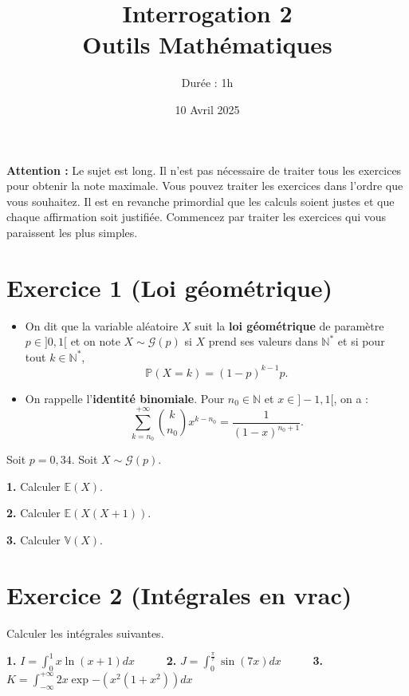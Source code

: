 \documentclass{article}
\title{Interrogation 2 \\
Outils Mathématiques}
\author{Durée : 1h}
\date{10 Avril 2025}
\newcommand{\E}{\mathbb{E}}
\newcommand{\prob}{\mathbb{P}}
\begin{document}
\maketitle

\textbf{Attention :} Le sujet est long. Il n'est pas nécessaire de traiter tous les exercices pour obtenir la note maximale. Vous pouvez traiter les exercices dans l'ordre que vous souhaitez. Il est en revanche primordial que les calculs soient justes et que chaque affirmation soit justifiée. Commencez par traiter les exercices qui vous paraissent les plus simples.

\section*{Exercice 1 (Loi géométrique)}

\begin{tcolorbox}[colframe=gray!50, colback=white, title=Rappels, fonttitle=\bfseries,
  boxrule=0.5pt, arc=0mm]
\begin{itemize}
    \item On dit que la variable aléatoire $X$ suit la \textbf{loi géométrique} de paramètre $p \in ]0,1[$ et on note $X \sim \mathcal{G}(p)$ si $X$ prend ses valeurs dans $\mathbb{N}^*$ et si pour tout $k \in \mathbb{N}^*$, 
    \[
    \prob(X = k) = (1-p)^{k-1} p.
    \]

    \item On rappelle l'\textbf{identité binomiale}. Pour $n_0 \in \mathbb{N}$ et $x \in ]-1,1[$, on a :
    \[
    \sum_{k=n_0}^{+\infty} \binom{k}{n_0} x^{k - n_0} = \frac{1}{(1 - x)^{n_0 + 1}}.
    \]
\end{itemize}
\end{tcolorbox}

Soit $p=0{,}34$. Soit $X \sim \mathcal{G}(p)$. 

\textbf{1.} Calculer $\E (X)$. 

\textbf{2.} Calculer $\E (X(X+1))$. 

\textbf{3.} Calculer $\mathbb{V} (X)$. 

\section*{Exercice 2 (Intégrales en vrac)}

Calculer les intégrales suivantes.

\textbf{1.} $I=\int_0^1 x \ln (x+1) dx$ \ \ \ \ \ \textbf{2.} $J=\int_0^{\frac{\pi}{7}} \sin (7x) dx$ \ \ \ \ \ \textbf{3.} $K = \int_{- \infty}^{+ \infty} 2x \exp{-(x^2(1+x^2))}dx$
\end{document}
